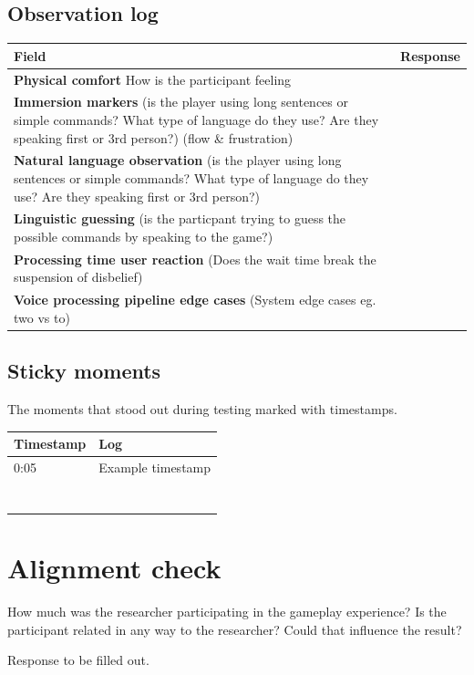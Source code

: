 \subsection{Observation log}
\begin{table}[H]
\centering
\begin{tabular}{|p{5cm}|p{10cm}|}
\hline
\textbf{Field} & \textbf{Response} \\ \hline
\textbf{Physical comfort} How is the participant feeling & \\[1.5cm] \hline
\textbf{Immersion markers} (is the player using long sentences or simple commands? What type of language do they use? Are they speaking first or 3rd person?) (flow \& frustration) & \\[1.5cm] \hline
\textbf{Natural language observation} (is the player using long sentences or simple commands? What type of language do they use? Are they speaking first or 3rd person?) & \\[1.5cm] \hline
\textbf{Linguistic guessing} (is the particpant trying to guess the possible commands by speaking to the game?) & \\[1.5cm] \hline
\textbf{Processing time user reaction} (Does the wait time break the suspension of disbelief)& \\[1.5cm] \hline
\textbf{Voice processing pipeline edge cases} (System edge cases eg. two vs to)& \\[1.5cm] \hline
\end{tabular}
\end{table}

\subsection{Sticky moments}
The moments that stood out during testing marked with timestamps.
\begin{table}[h]
\centering
\begin{tabular}{|p{3cm}|p{10cm}|}
\hline
\textbf{Timestamp} & \textbf{Log} \\ \hline
0:05 & Example timestamp \\ \hline 
 &  \\ \hline 
 &  \\ \hline 
 &  \\ \hline 
 &  \\ \hline 
 &  \\ \hline 
 &  \\ \hline 
 &  \\ \hline 

\end{tabular}
\end{table}

\section{Alignment check}
How much was the researcher participating in the gameplay experience? 
Is the participant related in any way to the researcher? Could that influence the result?

Response to be filled out.
